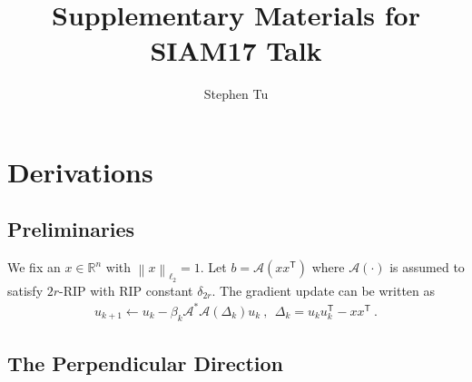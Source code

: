 \documentclass[10pt]{article}
\title{Supplementary Materials for SIAM17 Talk}
\author{Stephen Tu}
\newcommand{\A}{\ensuremath{\mathcal{A}}}
\newcommand{\R}{\ensuremath{\mathbb{R}}}
\newcommand{\twonorm}[1]{\left\lVert #1 \right\rVert_{\ell_2}}
\newcommand{\T}{\mathsf{T}}
\begin{document}
\maketitle

\section{Derivations}

\subsection{Preliminaries}

We fix an $x \in \R^n$ with $\twonorm{x} = 1$.
Let $b = \A(xx^\T)$ where $\A(\cdot)$ is assumed to satisfy $2r$-RIP with RIP constant $\delta_{2r}$.
The gradient update can be written as
\begin{align}
    u_{k+1} \gets u_k - \beta_k \A^*\A(\Delta_k) u_k \:, \:\: \Delta_k = u_ku_k^\T - xx^\T \:.
\end{align}

\subsection{The Perpendicular Direction}
\end{document}
